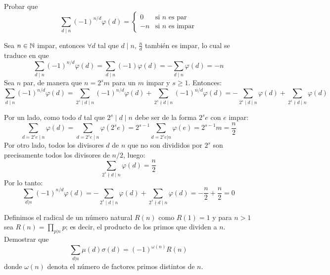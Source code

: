 \documentclass[twoside]{article}
\begin{document}
\newpage

\begin{ejercicio}{13}
Probar que	
\[
\sum_{d\mid n} (-1)^{n/d}\varphi(d) = 
\begin{cases}
0 & \text{si $n$ es par}\\ 
-n & \text{si $n$ es impar}
\end{cases}
\]
\begin{solucion}
Sea $n \in \mathbb{N}$ impar, entonces $\forall d$ tal que $d \mid n$, $\frac{n}{d}$ también es impar, lo cual se traduce en que
\[
\sum_{d\mid n} (-1)^{n/d}\varphi(d) = \sum_{d\mid n} (-1)\varphi(d) = -\sum_{d\mid n}\varphi(d) = -n
\]
Sea $n$ par, de manera que $n=2^sm$ para un $m$ impar y $s ≥ 1$. Entonces:
\[ \sum_{d\mid n}(-1)^{n/d}φ(d) =  \sum_{2^s\mid d \mid n}(-1)^{n/d}φ(d) +  \sum_{2^s\nmid d \mid n}(-1)^{n/d}φ(d) = -\sum_{2^s\mid d \mid n}φ(d) + \sum_{2^s\nmid d \mid n}φ(d) \]

Por un lado, como todo $d$ tal que $2^s\mid d \mid n$ debe ser de la forma $2^se$ con $e$ impar:
\[ \sum_{d=2^se \mid n} φ(d) = \sum_{d=2^se \mid n} φ(2^se) = 2^{s-1}\sum_{d=2^se|n} φ(e) = 2^{s-1}m = \frac{n}{2}\]
Por otro lado, todos los divisores $d$ de $n$ que no son divididos por $2^s$ son precisamente todos los divisores de $n/2$, luego:
\[ \sum_{2^s\nmid d \mid n}φ(d) = \frac{n}{2} \]
Por lo tanto:
\[ \sum_{d|n} (-1)^{n/d}φ(d) = -\sum_{2^s\mid d\mid n}φ(d)+\sum_{2^s\nmid d\mid n}φ(d) = -\frac{n}{2}+\frac{n}{2}=0\]
\end{solucion}

\newpage

\begin{ejercicio}{14}
Definimos el radical de un número natural $R(n)$ como $R(1) = 1$ y para $n > 1$ sea $R(n) = \prod_{p|n} p$; es decir, el producto de los primos que dividen a $n$. Demostrar que
\[ \sum_{d|n} μ(d) σ(d) = (-1)^{ω(n)} R(n) \]
donde $ω(n)$ denota el número de factores primos distintos de $n$.
\end{ejercicio}


\end{ejercicio}
\end{document}

